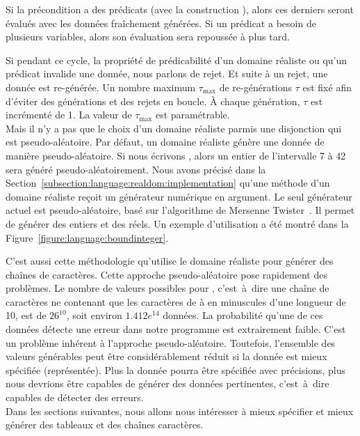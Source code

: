 Si la précondition a des prédicats (avec la construction ), alors ces
derniers seront évalués avec les données fraîchement générées. Si un prédicat a
besoin de plusieurs variables, alors son évaluation sera repoussée à plus tard.

Si pendant ce cycle, la propriété de prédicabilité d'un domaine réaliste ou
qu'un prédicat invalide une donnée, nous parlons de {\strong rejet}. Et suite à
un rejet, une donnée est re-générée. Un nombre maximum $\tau_\mathrm{max}$ de
re-générations $\tau$ est fixé afin d'éviter des générations et des rejets en
boucle. À chaque génération, $\tau$ est incrémenté de 1. La valeur de
$\tau_\mathrm{max}$ est paramétrable. \\

Mais il n'y a pas que le choix d'un domaine réaliste parmis une disjonction qui
est pseudo-aléatoire. Par défaut, un domaine réaliste génère une donnée de
manière pseudo-aléatoire.  Si nous écrivons , alors un
entier de l'intervalle 7 à 42 sera généré pseudo-aléatoirement. Nous avons
précisé dans la Section~\ref{subsection:language:realdom:implementation} qu'une
méthode  d'un domaine réaliste reçoit un générateur numérique en
argument. Le seul générateur actuel est pseudo-aléatoire, basé sur l'algorithme
de Mersenne Twister~. Il permet de générer des entiers et
des réels. Un exemple d'utilisation a été montré dans la
Figure~\ref{figure:language:boundinteger}.

C'est aussi cette méthodologie qu'utilise le domaine réaliste  pour
générer des chaînes de caractères. Cette approche pseudo-aléatoire pose
rapidement des problèmes. Le nombre de valeurs possibles pour , c'est~à~dire une chaîne de caractères ne contenant que les caractères
de  à  en minuscules d'une longueur de 10, est de $26^{10}$,
soit environ $1.412e^{14}$ données. La probabilité qu'une de ces données détecte
une erreur dans notre programme est extrairement faible. C'est un problème
inhérent à l'approche pseudo-aléatoire. Toutefois, l'ensemble des valeurs
générables peut être considérablement réduit si la donnée est mieux spécifiée
(représentée). Plus la donnée pourra être spécifiée avec précisions, plus nous
devrions être capables de générer des données pertinentes, c'est~à~dire capables
de détecter des erreurs. \\

Dans les sections suivantes, nous allons nous intéresser à mieux spécifier et
mieux générer des tableaux et des chaînes caractères.
